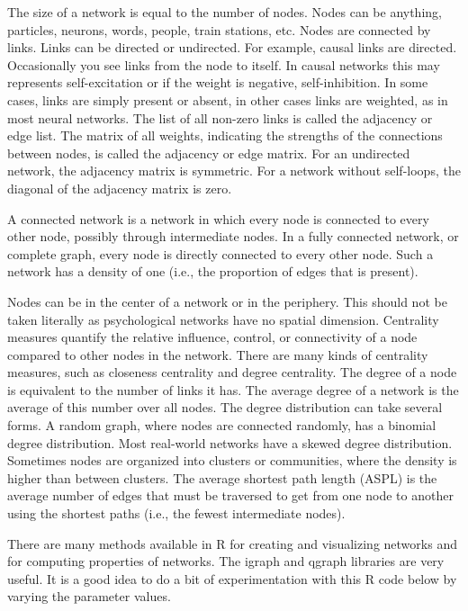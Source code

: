 \documentclass[
  a4paper,
  DIV=11,
  numbers=noendperiod]{scrreprt}
\begin{document}
The size of a network is equal to the number of nodes. Nodes can be
anything, particles, neurons, words, people, train stations, etc. Nodes
are connected by links. Links can be directed or undirected. For
example, causal links are directed. Occasionally you see links from the
node to itself. In causal networks this may represents self-excitation
or if the weight is negative, self-inhibition. In some cases, links are
simply present or absent, in other cases links are weighted, as in most
neural networks. The list of all non-zero links is called the adjacency
or edge list. The matrix of all weights, indicating the strengths of the
connections between nodes, is called the adjacency or edge matrix. For
an undirected network, the adjacency matrix is symmetric. For a network
without self-loops, the diagonal of the adjacency matrix is zero.

A connected network is a network in which every node is connected to
every other node, possibly through intermediate nodes. In a fully
connected network, or complete graph, every node is directly connected
to every other node. Such a network has a density of one (i.e., the
proportion of edges that is present).

Nodes can be in the center of a network or in the periphery. This should
not be taken literally as psychological networks have no spatial
dimension. Centrality measures quantify the relative influence, control,
or connectivity of a node compared to other nodes in the network. There
are many kinds of centrality measures, such as closeness centrality and
degree centrality. The degree of a node is equivalent to the number of
links it has. The average degree of a network is the average of this
number over all nodes. The degree distribution can take several forms. A
random graph, where nodes are connected randomly, has a binomial degree
distribution. Most real-world networks have a skewed degree
distribution. Sometimes nodes are organized into clusters or
communities, where the density is higher than between clusters. The
average shortest path length (ASPL) is the average number of edges that
must be traversed to get from one node to another using the shortest
paths (i.e., the fewest intermediate nodes).

There are many methods available in R for creating and visualizing
networks and for computing properties of networks. The igraph and qgraph
libraries are very useful. It is a good idea to do a bit of
experimentation with this R code below by varying the parameter values.
\end{document}

